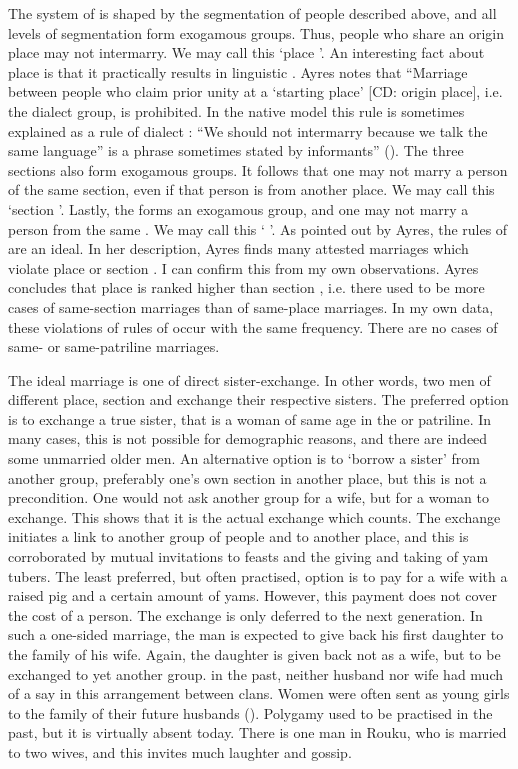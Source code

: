 The system of  is shaped by the segmentation of people described above, and all levels of segmentation form exogamous groups. Thus, people who share an origin place may not intermarry. We may call this `place '. An interesting fact about place  is that it practically results in linguistic . Ayres notes that ``Marriage between people who claim prior unity at a `starting place' [CD: origin place], i.e. the dialect group, is prohibited. In the native model this rule is sometimes explained as a rule of dialect : ``We should not intermarry because we talk the same language'' is a phrase sometimes stated by informants'' (\citeyear[186]{Ayres:ws}). The three sections also form exogamous groups. It follows that one may not marry a person of the same section, even if that person is from another place. We may call this `section '. Lastly, the  forms an exogamous group, and one may not marry a person from the same . We may call this ` '. As pointed out by Ayres, the rules of  are an ideal. In her description, Ayres finds many attested marriages which violate place or section . I can confirm this from my own observations. Ayres concludes that place  is ranked higher than section , i.e. there used to be more cases of same-section marriages than of same-place marriages. In my own data, these violations of rules of  occur with the same frequency. There are no cases of same- or same-patriline marriages.%

The ideal marriage is one of direct sister-exchange. In other words, two men of different place, section and  exchange their respective sisters. The preferred option is to exchange a true sister, that is a woman of same age in the  or patriline. In many cases, this is not possible for demographic reasons, and there are indeed some unmarried older men. An alternative option is to `borrow a sister' from another group, preferably one's own section in another place, but this is not a precondition. One would not ask another group for a wife, but for a woman to exchange. This shows that it is the actual exchange which counts. The exchange initiates a link to another group of people and to another place, and this is corroborated by mutual invitations to feasts and the giving and taking of yam tubers. The least preferred, but often practised, option is to pay for a wife with a raised pig and a certain amount of yams. However, this payment does not cover the cost of a person. The exchange is only deferred to the next generation. In such a one-sided marriage, the man is expected to give back his first daughter to the family of his wife. Again, the daughter is given back not as a wife, but to be exchanged to yet another group. in the past, neither husband nor wife had much of a say in this arrangement between clans. Women were often sent as young girls to the family of their future husbands (\citealt[145]{Williams:1936transfly}). Polygamy used to be practised in the past, but it is virtually absent today. There is one man in Rouku, who is married to two wives, and this invites much laughter and gossip.

